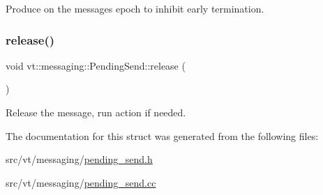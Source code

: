 Produce on the messages epoch to inhibit early termination. 

\mbox{\label{structvt_1_1messaging_1_1_pending_send_ad4b41412f953dcd22b3e3020a812f757}} 
\subsubsection{\texorpdfstring{release()}{release()}}
{\footnotesize\ttfamily void vt\+::messaging\+::\+Pending\+Send\+::release (\begin{DoxyParamCaption}{ }\end{DoxyParamCaption})\hspace{0.3cm}{\ttfamily [inline]}}



Release the message, run action if needed. 



The documentation for this struct was generated from the following files\+:\begin{DoxyCompactItemize}
\item 
src/vt/messaging/\hyperlink{pending__send_8h}{pending\+\_\+send.\+h}\item 
src/vt/messaging/\hyperlink{pending__send_8cc}{pending\+\_\+send.\+cc}\end{DoxyCompactItemize}
